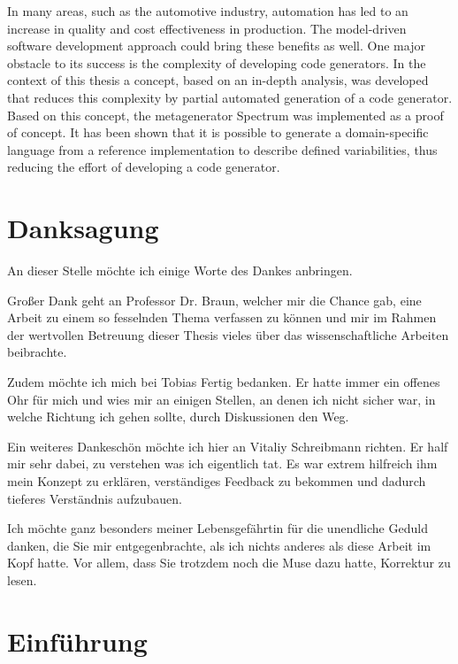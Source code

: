 \documentclass[12pt,oneside,a4paper,parskip]{scrbook}
\begin{document}
In many areas, such as the automotive industry, automation has led to an increase in quality and cost effectiveness in production. The model-driven software development approach could bring these benefits as well. One major obstacle to its success is the complexity of developing code generators. In the context of this thesis a concept, based on an in-depth analysis, was developed that reduces this complexity by partial automated generation of a code generator. Based on this concept, the metagenerator Spectrum was implemented as a proof of concept. It has been shown that it is possible to generate a domain-specific language from a reference implementation to describe defined variabilities, thus reducing the effort of developing a code generator.

\newpage
\chapter*{Danksagung}

An dieser Stelle möchte ich einige Worte des Dankes anbringen.

Großer Dank geht an Professor Dr. Braun, welcher mir die Chance gab, eine Arbeit zu einem so fesselnden Thema verfassen zu können und mir im Rahmen der wertvollen Betreuung dieser Thesis vieles über das wissenschaftliche Arbeiten beibrachte.

Zudem möchte ich mich bei Tobias Fertig bedanken. Er hatte immer ein offenes Ohr für mich und wies mir an einigen Stellen, an denen ich nicht sicher war, in welche Richtung ich gehen sollte, durch Diskussionen den Weg.

Ein weiteres Dankeschön möchte ich hier an Vitaliy Schreibmann richten. Er half mir sehr dabei, zu verstehen was ich eigentlich tat. Es war extrem hilfreich ihm mein Konzept zu erklären, verständiges Feedback zu bekommen und dadurch tieferes Verständnis aufzubauen.

Ich möchte ganz besonders meiner Lebensgefährtin für die unendliche Geduld danken, die Sie mir entgegenbrachte, als ich nichts anderes als diese Arbeit im Kopf hatte. Vor allem, dass Sie trotzdem noch die Muse dazu hatte, Korrektur zu lesen.

\tableofcontents



\mainmatter


\chapter{Einführung}\label{ch:intro}
\end{document}
